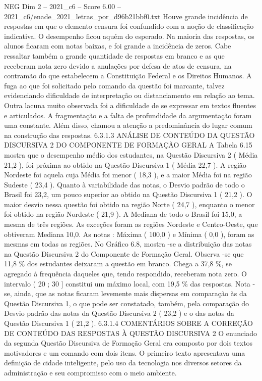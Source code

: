 \begin{textsample}{NEG Dim 2 – 2021\_c6 – Score 6.00 – 2021\_c6/enade\_2021\_letras\_por\_d96b21bbf0.txt}
Houve grande incidência de respostas em que o elemento censura foi confundido com a noção de classificação indicativa.
O desempenho ficou aquém do esperado.
Na maioria das respostas, os alunos ficaram com notas baixas, e foi grande a incidência de zeros.
Cabe ressaltar também a grande quantidade de respostas em branco e as que receberam nota zero devido a anulações por defesa de atos de censura, na contramão do que estabelecem a Constituição Federal e os Direitos Humanos.
A fuga ao que foi solicitado pelo comando da questão foi marcante, talvez evidenciando dificuldade de interpretação ou distanciamento em relação ao tema.
Outra lacuna muito observada foi a dificuldade de se expressar em textos fluentes e articulados.
A fragmentação e a falta de profundidade da argumentação foram uma constante.
Além disso, chamou a atenção a predominância do lugar comum na construção das respostas. 6.3.1.3 ANÁLISE DE CONTEÚDO DA QUESTÃO DISCURSIVA 2 DO COMPONENTE DE FORMAÇÃO GERAL A Tabela 6.15 mostra que o desempenho médio dos estudantes, na Questão Discursiva 2 ( Média 21,2 ), foi próxima ao obtido na Questão Discursiva 1 ( Média 22,7 ).
A região Nordeste foi aquela cuja Média foi menor ( 18,3 ), e a maior Média foi na região Sudeste ( 23,4 ).
Quanto à variabilidade das notas, o Desvio padrão de todo o Brasil foi 23,2, um pouco superior ao obtido na Questão Discursiva 1 ( 21,2 ).
O maior desvio nessa questão foi obtido na região Norte ( 24,7 ), enquanto o menor foi obtido na região Nordeste ( 21,9 ).
A Mediana de todo o Brasil foi 15,0, a mesma de três regiões.
As exceções foram as regiões Nordeste e Centro-Oeste, que obtiveram Mediana 10,0.
As notas : Máxima ( 100,0 ) e Mínima ( 0,0 ), foram as mesmas em todas as regiões.
No Gráfico 6.8, mostra -se a distribuição das notas na Questão Discursiva 2 do Componente de Formação Geral.
Observa -se que 11,8 \% dos estudantes deixaram a questão em branco.
Chega a 37,8 \%, se agregado à frequência daqueles que, tendo respondido, receberam nota zero.
O intervalo ( 20 ; 30 ] constitui um máximo local, com 19,5 \% das respostas.
Nota -se, ainda, que as notas ficaram levemente mais dispersas em comparação às da Questão Discursiva 1, o que pode ser constatado, também, pela comparação do Desvio padrão das notas da Questão Discursiva 2 ( 23,2 ) e o das notas da Questão Discursiva 1 ( 21,2 ). 6.3.1.4 COMENTÁRIOS SOBRE A CORREÇÃO DE CONTEÚDO DAS RESPOSTAS À QUESTÃO DISCURSIVA 2 O enunciado da segunda Questão Discursiva de Formação Geral era composto por dois textos motivadores e um comando com dois itens.
O primeiro texto apresentava uma definição de cidade inteligente, pelo uso da tecnologia nos diversos setores da administração e seu compromisso com o meio ambiente.

\end{textsample}
